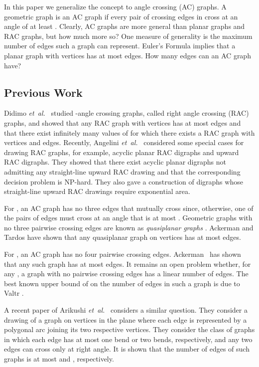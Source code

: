 \documentclass{patmorin}
\newcommand{\etal}{\emph{et~al.}}
\begin{document}
In this paper we generalize the concept to  angle crossing (AC) graphs.  A geometric graph  is an AC graph if every pair of crossing edges in  cross at an angle of at least .  Clearly, AC graphs are more general than planar graphs and RAC graphs, but how much more so?  One measure of generality is the maximum number of edges such a graph can represent.  Euler's Formula implies that a planar graph with  vertices has at most  edges.  How many edges can an AC graph have?


\subsection{Previous Work}
Didimo \etal\ \cite{del-dgrac-09} studied -angle crossing graphs, called right angle
crossing (RAC) graphs, and showed that any RAC graph with  vertices has at most  edges and
that there exist infinitely many values of  for
which there exists a RAC graph with  vertices and  edges.
Recently, Angelini \etal~\cite{acddfks-porac-09} considered some
special cases for drawing RAC graphs, for example, acyclic planar RAC
digraphs and upward RAC digraphs. They showed that there exist acyclic planar
digraphs not admitting any straight-line upward RAC drawing and that the
corresponding decision problem is NP-hard. They also gave a construction of
digraphs whose straight-line upward RAC drawings require exponential area.

For , an AC graph has no three edges that
mutually cross since, otherwise, one of the pairs of edges must
cross at an angle that is at most .  Geometric graphs with no
three pairwise crossing edges are known as \emph{quasiplanar graphs}
\cite{aapps-qpgln-97}. Ackerman and Tardos \cite[Theorem~5]{at-mneqp-07} have shown that
any quasiplanar graph on  vertices has at most  edges.

For , an AC graph has no four pairwise crossing edges.
Ackerman~\cite{a-mnetg-09} has shown that any such graph has at most  
edges.  It remains an open problem whether, for any , a graph with no
 pairwise crossing edges has a linear number of edges.  The best known
upper bound of  on the number of edges in such a graph is due
to Valtr \cite[Theorem~3]{v-epct-99}.

A recent paper of Arikushi \etal\ \cite{afkmt-dgoc-10} considers a similar question. They 
consider a drawing of a graph  on  vertices in the plane where each edge is represented 
by a polygonal arc joining its two respective vertices.  They consider the class of graphs in 
which each edge has at most one bend or two bends, respectively, and any two edges can cross 
only at right angle. It is shown that the number of edges of such graphs is at most  and 
, respectively. 
\end{document}
